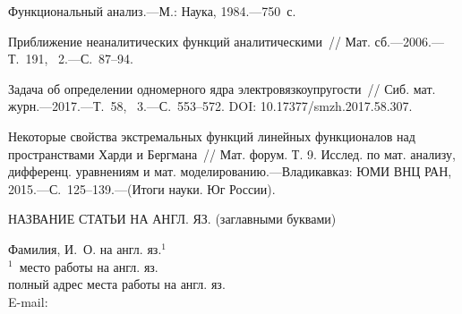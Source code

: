  \Primer{}






\Lit

 \begin{enumerate}
 {\footnotesize
 \itemsep=0pt
 \parskip=0pt


 {Функциональный анализ.---М.: Наука,  1984.---750~с.} %

 {Приближение неаналитических функций аналитическими~/\!/ Мат. сб.---2006.---Т.~191, \No~2.---С.~87--94.}%

 Задача об определении одномерного ядра электровязкоупругости~/\!/
 Сиб. мат. журн.---2017.---Т.~58, \No~3.---С.~553--572. DOI: 10.17377/smzh.2017.58.307. %

 {Некоторые свойства экстремальных функций линейных функционалов над пространствами Харди и Бергмана~/\!/
 Мат. форум. Т. 9. Исслед. по мат. анализу, дифференц. уравнениям и мат.
 моделированию.---Владикавказ: ЮМИ ВНЦ РАН, 2015.---С.~125--139.---(Итоги науки. Юг России).} %

 }
 \end{enumerate}







 \newpage



 \bigskip
 \begin{center}
 НАЗВАНИЕ СТАТЬИ НА АНГЛ. ЯЗ. (заглавными буквами)
 \end{center}


 \begin{center}
 Фамилия, И.~О. на англ. яз.$^{1}$\\[4pt]
 {\rm\footnotesize{$^1$\,
 место работы  на англ. яз.\\
 полный адрес места работы на англ. яз.\\
 E-mail: }}
 \end{center}



